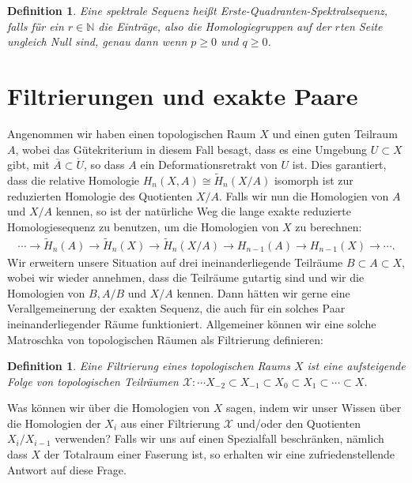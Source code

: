 \documentclass[12pt, hidelinks]{article}
\numberwithin{conj}{section}
\newtheorem{definition}[conj]{Definition}
\begin{document}
\begin{definition}
    Eine spektrale Sequenz heißt Erste-Quadranten-Spektralsequenz, falls für ein $r \in \mathbb{N}$ die Einträge, also die Homologiegruppen auf der $r$ten Seite ungleich Null sind, genau dann wenn $p \geq 0$ und $q \geq 0$.
\end{definition}

\section{Filtrierungen und exakte Paare}
Angenommen wir haben einen topologischen Raum $X$ und einen guten Teilraum $A$, wobei das Gütekriterium in diesem Fall besagt, dass es eine Umgebung $U \subset X$ gibt, mit $\overline{A} \subset \mathring{U}$, so dass $A$ ein Deformationsretrakt von $U$ ist. Dies garantiert, dass die relative Homologie $H_n(X,A) \cong \tilde{H}_n(X/A)$ isomorph ist zur reduzierten Homologie des Quotienten $X/A$. Falls wir nun die Homologien von $A$ und $X/A$ kennen, so ist der natürliche Weg die lange exakte reduzierte Homologiesequenz zu benutzen, um die Homologien von $X$ zu berechnen:
\begin{align}
    \cdots \to \tilde{H}_n(A) \to \tilde{H}_n(X) \to \tilde{H}_n(X/A) \to H_{n-1}(A) \to H_{n-1}(X) \to \cdots.
\end{align}
Wir erweitern unsere Situation auf drei ineinanderliegende Teilräume $B \subset A \subset X$, wobei wir wieder annehmen, dass die Teilräume gutartig sind und wir die Homologien von $B, A/B$ und $X/A$ kennen. Dann hätten wir gerne eine Verallgemeinerung der exakten Sequenz, die auch für ein solches Paar ineinanderliegender Räume funktioniert. Allgemeiner können wir eine solche Matroschka von topologischen Räumen als Filtrierung definieren:

\begin{definition}
    Eine Filtrierung eines topologischen Raums $X$ ist eine aufsteigende Folge von topologischen Teilräumen $\mathcal{X}: \cdots X_{-2} \subset X_{-1} \subset X_{0} \subset X_{1} \subset \cdots \subset X$.
\end{definition}

Was können wir über die Homologien von $X$ sagen, indem wir unser Wissen über die Homologien der $X_i$ aus einer Filtrierung $\mathcal{X}$ und/oder den Quotienten $X_i/X_{i-1}$ verwenden? Falls wir uns auf einen Spezialfall beschränken, nämlich dass $X$ der Totalraum einer Faserung ist, so erhalten wir eine zufriedenstellende Antwort auf diese Frage.
\end{document}
